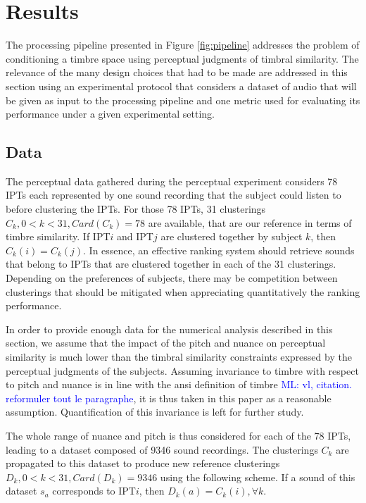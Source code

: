\documentclass{bmcart}
\newcommand{\ipt}{IPT\xspace}
\newcommand{\ipts}{IPTs\xspace}
\newcommand{\ml}[1]{\textcolor{blue}{ML: #1}}
\begin{document}
\section*{Results}
\label{sec:results}

The processing pipeline presented in Figure \ref{fig:pipeline} addresses the problem of conditioning a timbre space using perceptual judgments of timbral similarity. The relevance of the many design choices that had to be made  are addressed in this section using an experimental protocol that considers a dataset of audio that will be given as input to the processing pipeline and one metric used for evaluating its performance under a given experimental setting.

\subsection*{Data}

The perceptual data gathered during the perceptual experiment considers 78 \ipts each represented by one sound recording that the subject could listen to before clustering the \ipts. For those 78 \ipts, 31 clusterings $C_k, 0<k<31, Card(C_k)=78$ are available, that are our reference in terms of timbre similarity. If \ipt $i$ and \ipt $j$ are clustered together by subject $k$, then $C_k(i)=C_k(j)$. In essence, an effective ranking system should retrieve sounds that belong to \ipts that are clustered together in each of the 31 clusterings. Depending on the preferences of subjects, there may be competition between clusterings that should be mitigated when appreciating quantitatively the ranking performance.

In order to provide enough data for the numerical analysis described in this section, we assume that the impact of the pitch and nuance on perceptual similarity is much lower than the timbral similarity constraints expressed by the perceptual judgments of the subjects. Assuming invariance to timbre with respect to pitch and nuance is in line with the ansi definition of timbre \ml{vl, citation. reformuler tout le paragraphe}, it is  thus taken in this paper as a reasonable assumption. Quantification of this invariance is left for further study.

The whole range of nuance and pitch is thus considered for each of the 78 \ipts, leading to a dataset composed of 9346 sound recordings. The clusterings $C_k$ are propagated to this dataset to produce new reference clusterings $D_k, 0<k<31, Card(D_k)=9346$ using the following scheme. If a sound of this dataset $s_a$ corresponds to \ipt $i$, then $D_k(a) = C_k(i), \forall k$.
\end{document}
